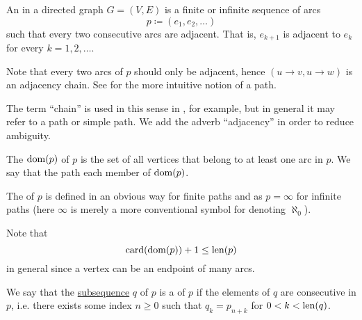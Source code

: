 \begin{definition}\label{def:graph_adjacency_chain}
  An  in a directed graph \( G = (V, E) \) is a finite or infinite sequence of arcs
  \begin{equation}\label{eq:def:graph_adjacency_chain}
    p \coloneqq (e_1, e_2, \ldots)
  \end{equation}
  such that every two consecutive arcs are adjacent. That is, \( e_{k+1} \) is adjacent to \( e_k \) for every \( k = 1, 2, \ldots \).

  Note that every two arcs of \( p \) should only be adjacent, hence \( (u \to v, u \to w) \) is an adjacency chain. See  for the more intuitive notion of a path.

  The term \enquote{chain} is used in this sense in \cite[ch. 1, sec. 3.1]{GondranMinoux1984Graphs}, for example, but in general it may refer to a path or simple path. We add the adverb \enquote{adjacency} in order to reduce ambiguity.

  \begin{thmenum}
     The  \( \operatorname{dom}(p) \) of \( p \) is the set of all vertices that belong to at least one arc in \( p \). We say that the path  each member of \( \operatorname{dom}(p) \).

     The  of \( p \) is defined in an obvious way for finite paths and as \( p = \infty \) for infinite paths (here \( \infty \) is merely a more conventional symbol for denoting \hyperref[thm:omega_is_a_cardinal]{\( \aleph_0 \)}).

    Note that
    \begin{equation}\label{eq:def:graph_adjacency_chain/length_and_domain}
      \operatorname{card}(\operatorname{dom}(p)) + 1 \leq \operatorname{len}(p)
    \end{equation}
    in general since a vertex can be an endpoint of many arcs.

     We say that the \hyperref[def:subsequence]{subsequence} \( q \) of \( p \) is a  of \( p \) if the elements of \( q \) are consecutive in \( p \), i.e. there exists some index \( n \geq 0 \) such that \( q_k = p_{n + k} \) for \( 0 < k < \operatorname{len}(q) \).


\end{thmenum}
\end{definition}
